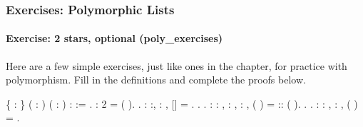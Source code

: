 \documentclass[12pt]{report}
\begin{document}
\subsubsection{Exercises: Polymorphic Lists}



\paragraph{Exercise: 2 stars, optional (poly\_exercises)}

 Here are a few simple exercises, just like ones in the 
    chapter, for practice with polymorphism.  Fill in the definitions
    and complete the proofs below. \begin{coqdoccode}
\coqdocemptyline
\coqdocnoindent
{}  \{ : \} ( : ) ( : ) :   :=\coqdoceol
\coqdocindent{1.00em}
 .\coqdoceol
\coqdocemptyline
\coqdocnoindent
{} :\coqdoceol
\coqdocindent{1.00em}
  2 =   (  ).\coqdoceol
 .\coqdoceol
\coqdocemptyline
\coqdocnoindent
{}  : \coqdockw{\ensuremath{\forall}} :, \coqdockw{\ensuremath{\forall}} : ,\coqdoceol
\coqdocindent{1.00em}
 []  = .\coqdoceol
\coqdocnoindent
{}.\coqdoceol
 .\coqdoceol
\coqdocemptyline
\coqdocnoindent
{}  : \coqdockw{\ensuremath{\forall}}  : ,\coqdoceol
\coqdocindent{10.50em}
\coqdockw{\ensuremath{\forall}}  : ,\coqdoceol
\coqdocindent{10.50em}
\coqdockw{\ensuremath{\forall}}  :  ,\coqdoceol
\coqdocindent{1.00em}
 (  ) =  :: ( ).\coqdoceol
\coqdocnoindent
{}.\coqdoceol
 .\coqdoceol
\coqdocemptyline
\coqdocnoindent
{}  : \coqdockw{\ensuremath{\forall}}  : , \coqdockw{\ensuremath{\forall}}  :  ,\coqdoceol
\coqdocindent{1.00em}
 ( ) = .\coqdoceol

\end{coqdoccode}
\end{document}
